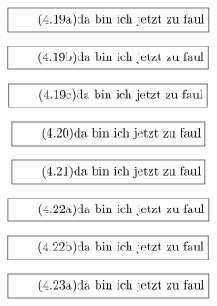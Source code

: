 \documentclass[11pt]{article}
\newcommand{\1}{ {\mathds{1}} }
\begin{document}
    \begin{equation}
      \boxed{
        \tag{4.19a}
        \begin{split}
          \text{da bin ich jetzt zu faul}
        \end{split}
      }
    \end{equation}


    \begin{equation}
      \boxed{
        \tag{4.19b}
        \begin{split}
          \text{da bin ich jetzt zu faul}
        \end{split}
      }
    \end{equation}

    \begin{equation}
      \boxed{
        \tag{4.19c}
        \begin{split}
          \text{da bin ich jetzt zu faul}
        \end{split}
      }
    \end{equation}

    \begin{equation}
      \boxed{
        \tag{4.20}
        \begin{split}
          \text{da bin ich jetzt zu faul}
        \end{split}
      }
    \end{equation}

    \begin{equation}
      \boxed{
        \tag{4.21}
        \begin{split}
          \text{da bin ich jetzt zu faul}
        \end{split}
      }
    \end{equation}

    \begin{equation}
      \boxed{
        \tag{4.22a}
        \begin{split}
          \text{da bin ich jetzt zu faul}
        \end{split}
      }
    \end{equation}

    \begin{equation}
      \boxed{
        \tag{4.22b}
        \begin{split}
          \text{da bin ich jetzt zu faul}
        \end{split}
      }
    \end{equation}
    
    \begin{equation}
      \boxed{
        \tag{4.23a}
        \begin{split}
          \text{da bin ich jetzt zu faul}
        \end{split}
      }
    \end{equation}
\end{document}
